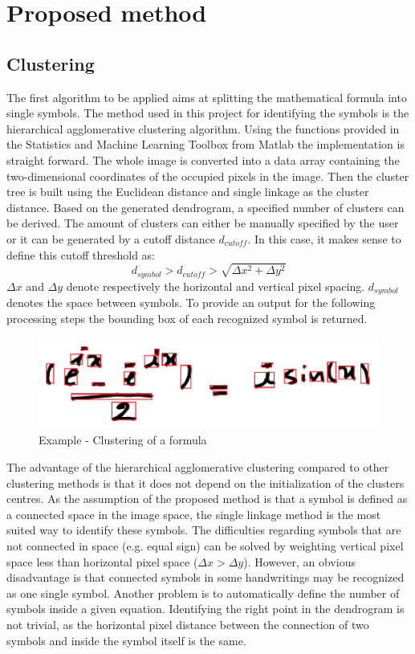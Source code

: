 \documentclass[twocolumn]{article}%
\begin{document}
	    
	\section{Proposed method}
	\subsection{Clustering}
		The first algorithm to be applied aims at splitting the mathematical formula into single symbols. The method used in this project for identifying the symbols is the hierarchical agglomerative clustering algorithm. Using the functions provided in the Statistics and Machine Learning Toolbox from Matlab \cite{sml_matlab} the implementation is straight forward. The whole image is converted into a data array containing the two-dimensional coordinates of the occupied pixels in the image. Then the cluster tree is built using the Euclidean distance and single linkage as the cluster distance. Based on the generated dendrogram, a specified number of clusters can be derived. The amount of clusters can either be manually specified by the user or it can be generated by a cutoff distance $d_{cutoff}$. In this case, it makes sense to define this cutoff threshold as:
		\begin{equation}
		d_{symbol} > d_{cutoff} > \sqrt{\Delta x^2 + \Delta y^2}
		\end{equation}
		$\Delta x$ and $\Delta y$ denote respectively the horizontal and vertical pixel spacing. $d_{symbol}$ denotes the space between symbols. To provide an output for the following processing steps the bounding box of each recognized symbol is returned.
		
	\begin{figure}[htp]
	\centering
	\includegraphics[scale=0.31]{images/cluster.png}
	\caption{Example - Clustering of a formula}
	\end{figure}
	
			The advantage of the hierarchical agglomerative clustering compared to other clustering methods is that it does not depend on the initialization of the clusters centres. As the assumption of the proposed method is that a symbol is defined as a connected space in the image space, the single linkage method is the most suited way to identify these symbols. The difficulties regarding symbols that are not connected in space (e.g. equal sign) can be solved by weighting vertical pixel space less than horizontal pixel space ($\Delta x > \Delta y$). 
		However, an obvious disadvantage is that connected symbols in some handwritings may be recognized as one single symbol. Another problem is to automatically define the number of symbols inside a given equation. Identifying the right point in the dendrogram is not trivial, as the horizontal pixel distance between the connection of two symbols and inside the symbol itself is the same.
	
\end{document}
